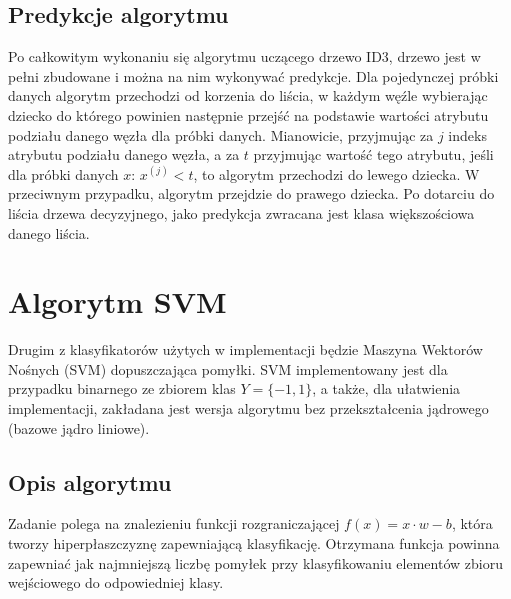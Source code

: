 \documentclass[
    left=2.5cm,         %
    right=2.5cm,        %
    top=2.5cm,          %
    bottom=3cm,         %
    bindingoffset=6mm,  %
    nohyphenation=false %
]{eiti/eiti-report}
\begin{document}
\subsection{Predykcje algorytmu}
Po całkowitym wykonaniu się algorytmu uczącego drzewo ID3, drzewo jest w pełni zbudowane i można na nim wykonywać predykcje. Dla pojedynczej próbki danych algorytm przechodzi od korzenia do liścia, w każdym węźle wybierając dziecko do którego powinien następnie przejść na podstawie wartości atrybutu podziału danego węzła dla próbki danych. Mianowicie, przyjmując za $j$ indeks atrybutu podziału danego węzła, a za $t$ przyjmując wartość tego atrybutu, jeśli dla próbki danych $x$: \begin{math}
    x^{(j)} < t
\end{math}, to algorytm przechodzi do lewego dziecka. W przeciwnym przypadku, algorytm przejdzie do prawego dziecka. Po dotarciu do liścia drzewa decyzyjnego, jako predykcja zwracana jest klasa większościowa danego liścia.


\section{Algorytm SVM}
Drugim z klasyfikatorów użytych w implementacji będzie Maszyna Wektorów Nośnych (SVM) dopuszczająca pomyłki. SVM implementowany jest dla przypadku binarnego ze zbiorem klas $Y=\{-1,1\}$, a także, dla ułatwienia implementacji, zakładana jest wersja algorytmu bez przekształcenia jądrowego (bazowe jądro liniowe).

\subsection{Opis algorytmu}
Zadanie polega na znalezieniu funkcji rozgraniczającej $ f(x)={x\cdot w-b} $, która tworzy hiperpłaszczyznę zapewniającą klasyfikację. Otrzymana funkcja powinna zapewniać jak najmniejszą liczbę pomyłek przy klasyfikowaniu elementów zbioru wejściowego do odpowiedniej klasy.
\end{document}
